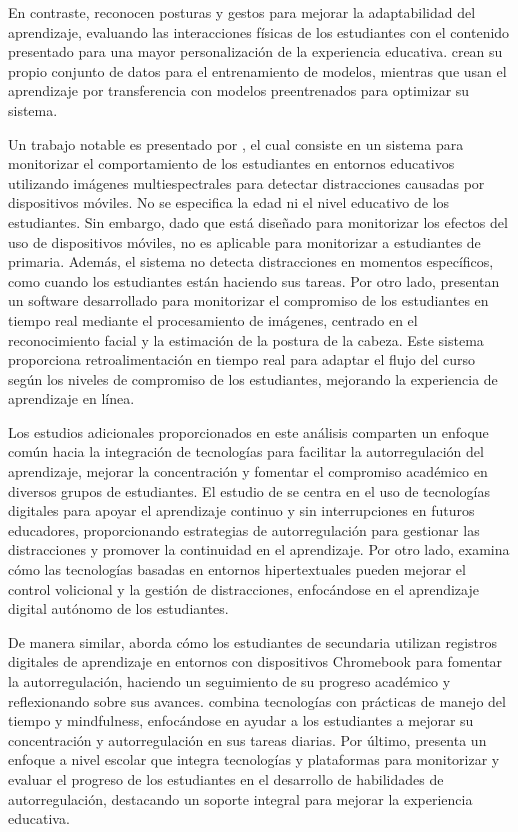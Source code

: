 \documentclass[a4paper,fleqn]{cas-sc}
\begin{document}
	En contraste, \cite{Riquelme2013} reconocen posturas y gestos para mejorar la adaptabilidad del aprendizaje, evaluando las interacciones físicas de los estudiantes con el contenido presentado para una mayor personalización de la experiencia educativa. \cite{Nguyen2019} crean su propio conjunto de datos para el entrenamiento de modelos, mientras que \cite{Riquelme2013} usan el aprendizaje por transferencia con modelos preentrenados para optimizar su sistema.
	
	Un trabajo notable es presentado por \cite{Campbell2015Using}, el cual consiste en un sistema para monitorizar el comportamiento de los estudiantes en entornos educativos utilizando imágenes multiespectrales para detectar distracciones causadas por dispositivos móviles. No se especifica la edad ni el nivel educativo de los estudiantes. Sin embargo, dado que está diseñado para monitorizar los efectos del uso de dispositivos móviles, no es aplicable para monitorizar a estudiantes de primaria. Además, el sistema no detecta distracciones en momentos específicos, como cuando los estudiantes están haciendo sus tareas. Por otro lado, \cite{Ucar2022Recognizing} presentan un software desarrollado para monitorizar el compromiso de los estudiantes en tiempo real mediante el procesamiento de imágenes, centrado en el reconocimiento facial y la estimación de la postura de la cabeza. Este sistema proporciona retroalimentación en tiempo real para adaptar el flujo del curso según los niveles de compromiso de los estudiantes, mejorando la experiencia de aprendizaje en línea.
	
	Los estudios adicionales proporcionados en este análisis comparten un enfoque común hacia la integración de tecnologías para facilitar la autorregulación del aprendizaje, mejorar la concentración y fomentar el compromiso académico en diversos grupos de estudiantes. El estudio de \cite{Bembich2016Future} se centra en el uso de tecnologías digitales para apoyar el aprendizaje continuo y sin interrupciones en futuros educadores, proporcionando estrategias de autorregulación para gestionar las distracciones y promover la continuidad en el aprendizaje. Por otro lado, \cite{Peters2003Self} examina cómo las tecnologías basadas en entornos hipertextuales pueden mejorar el control volicional y la gestión de distracciones, enfocándose en el aprendizaje digital autónomo de los estudiantes.
	
	De manera similar, \cite{Roberts2020Task} aborda cómo los estudiantes de secundaria utilizan registros digitales de aprendizaje en entornos con dispositivos Chromebook para fomentar la autorregulación, haciendo un seguimiento de su progreso académico y reflexionando sobre sus avances. \cite{Adcroft2018Developing} combina tecnologías con prácticas de manejo del tiempo y mindfulness, enfocándose en ayudar a los estudiantes a mejorar su concentración y autorregulación en sus tareas diarias. Por último, \cite{Salter2014Exploring} presenta un enfoque a nivel escolar que integra tecnologías y plataformas para monitorizar y evaluar el progreso de los estudiantes en el desarrollo de habilidades de autorregulación, destacando un soporte integral para mejorar la experiencia educativa.
	
\end{document}
